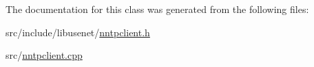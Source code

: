 The documentation for this class was generated from the following files\+:\begin{DoxyCompactItemize}
\item 
src/include/libusenet/\hyperlink{nntpclient_8h}{nntpclient.\+h}\item 
src/\hyperlink{nntpclient_8cpp}{nntpclient.\+cpp}\end{DoxyCompactItemize}
